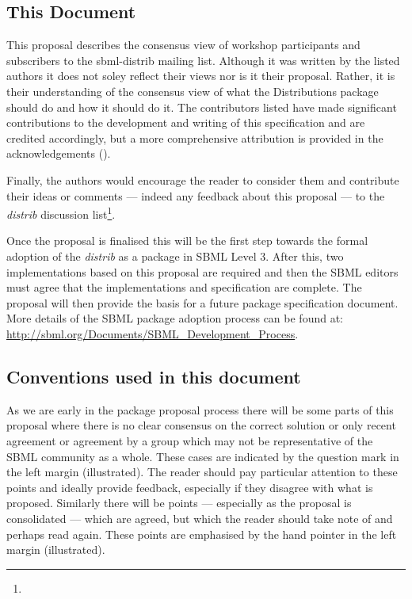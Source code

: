 \documentclass[draftspec]{sbmlpkgspec}
\newcommand{\distribshort}{\emph{distrib}\xspace}
\newcommand{\distrib}{Distributions\xspace}
\newcommand{\watchout}{\marginpar{\hspace*{34pt}\raisebox{-0.5ex}{\Large\ding{43}}}}
\newcommand{\controversial}{\marginpar{\hspace*{34pt}\raisebox{-0.5ex}{\Large?}}}
\begin{document}
\subsection{This Document}

This proposal describes the consensus view of workshop participants
and subscribers to the sbml-distrib mailing list. Although it was
written by the listed authors it does not soley reflect their views nor is
it their proposal. Rather, it is their understanding of the consensus
view of what the \distrib package should do and how it should do
it. The contributors listed have made significant contributions to the
development and writing of this specification and are credited
accordingly, but a more comprehensive attribution is provided in the
acknowledgements ().

Finally, the authors would encourage the
reader to consider them and contribute their ideas or comments ---
indeed any feedback about this proposal --- to the \distribshort
discussion list\footnote{}.

Once the proposal is finalised this will be the first step towards the
formal adoption of the \distribshort as a package in SBML Level
3. After this, two implementations based on this proposal are required
and then the SBML editors must agree that the implementations and specification are complete. The proposal
will then provide the basis for a future package specification
document. More details of the SBML package adoption process can be
found at: \url{http://sbml.org/Documents/SBML_Development_Process}.


\subsection{Conventions used in this document}

As we are early in the package proposal process there will be some
parts of this proposal where there is no clear consensus on the
correct solution or only recent agreement or agreement by a group
which may not be representative of the SBML community as a
whole. These cases are indicated by the \controversial question mark
in the left margin (illustrated). The reader should pay particular
attention to these points and ideally provide feedback, especially if
they disagree with what is proposed. Similarly there will be points
--- especially as the proposal is consolidated --- which are agreed,
but which the reader should take note of and perhaps read again. These
points \watchout are emphasised by the hand pointer in the left margin
(illustrated).
\end{document}
